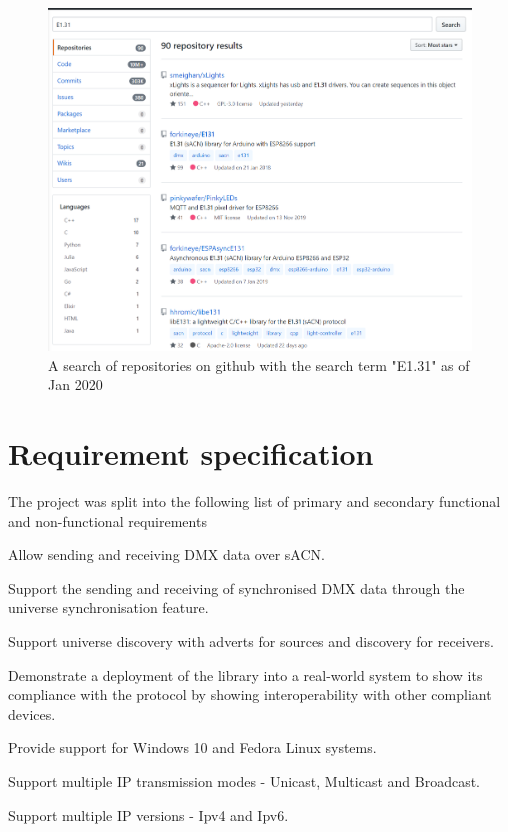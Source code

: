 \documentclass[11pt,a4paper]{article}
\begin{document}
\begin{figure}
	\label{E131_REPO_SEARCH}
	\includegraphics[width=\textwidth]{E131-Repo-Search}
	\caption{A search of repositories on github with the search term "E1.31" as of Jan 2020}
\end{figure}

\section{Requirement specification}
The project was split into the following list of primary and secondary functional and non-functional requirements\\
\begin{list}{}{Primary, Functional Requirements}
	\item Allow sending and receiving DMX data over sACN.
	\item Support the sending and receiving of synchronised DMX data through the universe synchronisation feature.
	\item Support universe discovery with adverts for sources and discovery for receivers.
\end{list}
\begin{list}{}{Secondary, Non Functional Requirements}
	\item Demonstrate a deployment of the library into a real-world system to show its compliance with the protocol by showing interoperability with other compliant devices.
	\item Provide support for Windows 10 and Fedora Linux systems.
	\item Support multiple IP transmission modes - Unicast, Multicast and Broadcast.
	\item Support multiple IP versions - Ipv4 and Ipv6.
\end{list}
\end{document}
